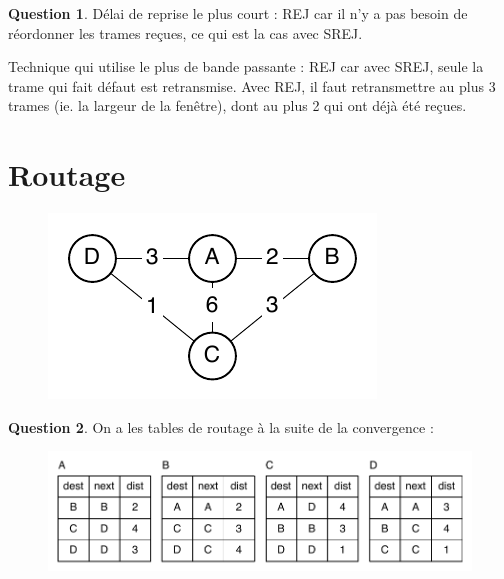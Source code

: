 \documentclass[11pt,english,french]{scrreprt}
\theoremstyle{remark}
\theoremstyle{definition}
\newtheorem{ques}{Question}[section]
\begin{document}
\setcounter{ques}{4}

\begin{ques}
	Délai de reprise le plus court : REJ car il n'y a pas besoin de réordonner les trames reçues, ce qui est la cas avec SREJ.
	
	Technique qui utilise le plus de bande passante : REJ car avec SREJ, seule la trame qui fait défaut est retransmise. Avec REJ, il faut retransmettre au plus 3 trames (ie. la largeur de la fenêtre), dont au plus 2 qui ont déjà été reçues. 
\end{ques}

\clearpage

\section{Routage} %

\begin{figure}[h!]
	\center
	\includegraphics[scale=.7]{Exam2009/routeurs}
\end{figure}

\begin{ques}
	On a les tables de routage à la suite de la convergence : 
	\begin{figure}[h!]
		\center
		\includegraphics[scale=.7]{Exam2009/tables1}
	\end{figure}
\end{ques}
\end{document}
